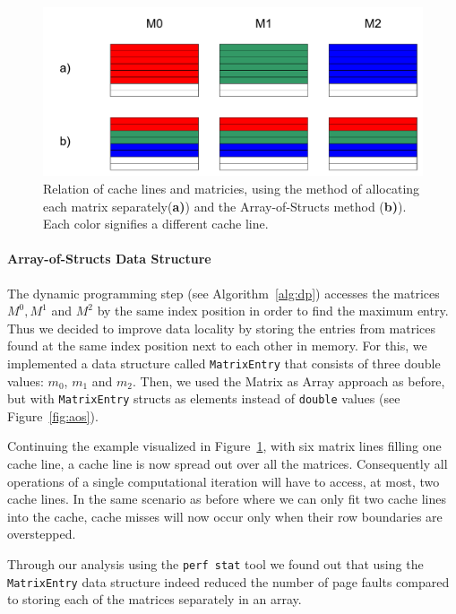 \documentclass{article}
\begin{document}
\begin{figure}
\centering
\includegraphics[width=\textwidth]{images/cachelines.pdf}
\caption{Relation of cache lines and matricies, using the method of allocating each matrix separately(\textbf{a)}) and the Array-of-Structs method (\textbf{b)}). Each color signifies a different cache line.}
\label{fig:cachelines}
\end{figure}

\paragraph{Array-of-Structs Data Structure}
The dynamic programming step (see Algorithm~\ref{alg:dp}) accesses the matrices $M^0, M^1$ and $M^2$ by the same index position in order to find the maximum entry. Thus we decided to improve data locality by storing the entries from matrices found at the same index position next to each other in memory. For this, we implemented a data structure called \texttt{MatrixEntry} that consists of three double values: \texttt{$m_0$}, \texttt{$m_1$} and \texttt{$m_2$}. Then, we used the Matrix as Array approach as before, but with \texttt{MatrixEntry} structs as elements instead of \texttt{double} values (see Figure~\ref{fig:aos}). 

Continuing the example visualized in Figure~\ref{fig:cachelines}, with six matrix lines filling one cache line, a cache line is now spread out over all the matrices. Consequently all operations of a single computational iteration will have to access, at most, two cache lines. In the same scenario as before where we can only fit two cache lines into the cache, cache misses will now occur only when their row boundaries are overstepped.

Through our analysis using the \texttt{perf stat} tool we found out that using the \texttt{MatrixEntry} data structure indeed reduced the number of page faults compared to storing each of the matrices separately in an array.
\end{document}
